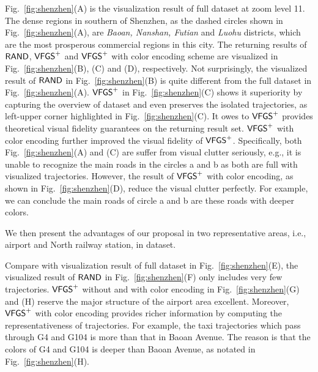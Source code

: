 Fig.~\ref{fig:shenzhen}(A) is the visualization result of full \sz{} dataset at zoom level 11.
The dense regions in southern of Shenzhen, as the dashed circles shown in Fig.~\ref{fig:shenzhen}(A), are \emph{Baoan, Nanshan, Futian} and \emph{Luohu} districts,
which are the most prosperous commercial regions in this city.
The returning results of $\mathsf{RAND}$, $\mathsf{VFGS}^{+}$ and $\mathsf{VFGS}^{+}$ with color encoding scheme are visualized in Fig.~\ref{fig:shenzhen}(B), (C) and (D), respectively.
Not surprisingly,  the visualized result of $\mathsf{RAND}$ in Fig.~\ref{fig:shenzhen}(B) is quite different from the full dataset in Fig.~\ref{fig:shenzhen}(A).
$\mathsf{VFGS}^{+}$ in Fig.~\ref{fig:shenzhen}(C) shows it superiority by capturing the overview of \sz{} dataset and even preserves the isolated trajectories, as left-upper corner highlighted in  Fig.~\ref{fig:shenzhen}(C).
It owes to $\mathsf{VFGS}^{+}$ provides theoretical visual fidelity guarantees on the returning result set.
$\mathsf{VFGS}^{+}$ with color encoding further improved the visual fidelity of $\mathsf{VFGS}^{+}$.
Specifically, both Fig.~\ref{fig:shenzhen}(A) and (C) are suffer from visual clutter seriously,
e.g., it is unable to recognize the main roads in the circles a and b as both are full with visualized trajectories.
However, the result of $\mathsf{VFGS}^{+}$ with color encoding, as shown in Fig.~\ref{fig:shenzhen}(D), reduce the visual clutter perfectly.
For example, we can conclude the main roads of circle a and b are these roads with deeper colors.

We then present the advantages of our proposal in two representative areas, i.e., airport and North railway station, in \sz{} dataset.

Compare with visualization result of full dataset in Fig.~\ref{fig:shenzhen}(E),
the visualized result of $\mathsf{RAND}$ in Fig.~\ref{fig:shenzhen}(F) only includes very few trajectories.
$\mathsf{VFGS}^{+}$ without and with color encoding in Fig.~\ref{fig:shenzhen}(G) and (H) reserve the major structure of the airport area excellent.
Moreover, $\mathsf{VFGS}^{+}$ with color encoding provides richer information by computing the representativeness of trajectories.
For example, the taxi trajectories which pass through G4 and G104 is more than that in Baoan Avenue.
The reason is that the colors of G4 and G104 is deeper than Baoan Avenue, as notated in Fig.~\ref{fig:shenzhen}(H).


